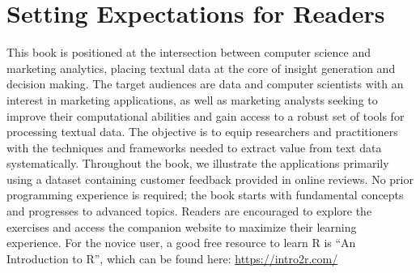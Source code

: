 \section{Setting Expectations for
Readers}\label{setting-expectations-for-readers}

This book is positioned at the intersection between computer science and marketing analytics, placing textual data at the core of insight generation and decision making. The target audiences are data and computer scientists with an interest in marketing applications, as well as marketing analysts seeking to improve their computational abilities and gain access to a robust set of tools for processing textual data. The objective is to equip researchers and practitioners with the techniques and frameworks needed to extract value from text data systematically. Throughout the book, we illustrate the applications primarily using a dataset containing customer feedback provided in online reviews. No prior programming experience is required; the book starts with fundamental concepts and progresses to advanced topics. Readers are encouraged to explore the exercises and access the companion website to maximize their learning experience. For the novice user, a good free resource to learn R is ``An Introduction to R'', which can be found here: \url{https://intro2r.com/}
